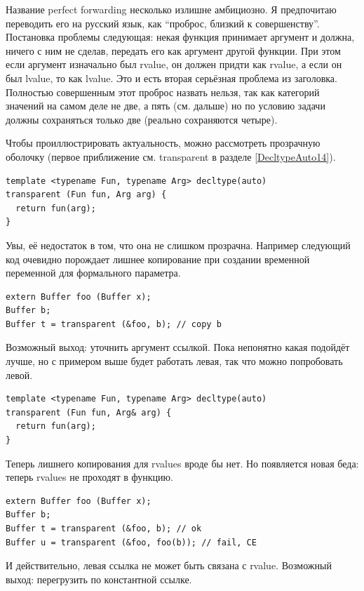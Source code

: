\documentclass[a4paper,12pt,oneside]{book}
\begin{document}
Название perfect forwarding несколько излишне амбициозно. Я предпочитаю переводить его на русский язык, как ``проброс, близкий к совершенству''. Постановка проблемы следующая: некая функция принимает аргумент и должна, ничего с ним не сделав, передать его как аргумент другой функции. При этом если аргумент изначально был rvalue, он должен придти как rvalue, а если он был lvalue, то как lvalue. Это и есть вторая серьёзная проблема из заголовка. Полностью совершенным этот проброс назвать нельзя, так как категорий значений на самом деле не две, а пять (см. дальше) но по условию задачи должны сохраняться только две (реально сохраняются четыре).

Чтобы проиллюстрировать актуальность, можно рассмотреть прозрачную оболочку (первое приближение см. transparent в разделе \ref{DecltypeAuto14}).

\begin{lstlisting}
template <typename Fun, typename Arg> decltype(auto)
transparent (Fun fun, Arg arg) { 
  return fun(arg); 
}
\end{lstlisting}

Увы, её недостаток в том, что она не слишком прозрачна. Например следующий код очевидно порождает лишнее копирование при создании временной переменной для формального параметра.

\begin{lstlisting}
extern Buffer foo (Buffer x);
Buffer b;
Buffer t = transparent (&foo, b); // copy b
\end{lstlisting}

Возможный выход: уточнить аргумент ссылкой. Пока непонятно какая подойдёт лучше, но с примером выше будет работать левая, так что можно попробовать левой.

\begin{lstlisting}
template <typename Fun, typename Arg> decltype(auto)
transparent (Fun fun, Arg& arg) {
  return fun(arg); 
}
\end{lstlisting}

Теперь лишнего копирования для rvalues вроде бы нет. Но появляется новая беда: теперь rvalues не проходят в функцию.

\begin{lstlisting}
extern Buffer foo (Buffer x);
Buffer b;
Buffer t = transparent (&foo, b); // ok
Buffer u = transparent (&foo, foo(b)); // fail, CE
\end{lstlisting}

И действительно, левая ссылка не может быть связана с rvalue. Возможный выход: перегрузить по константной ссылке.
\end{document}
